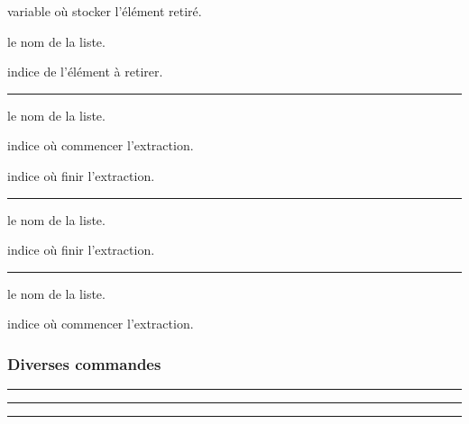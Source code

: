 \documentclass[12pt,a4paper]{article}
\theoremstyle{definition}
\newcommand\separation{
    \medskip
    \hfill\rule{0.5\textwidth}{0.75pt}\hfill
    \medskip
}
\newcommand\extraspace{
    \vspace{0.25em}
}
\begin{document}
 variable où stocker l'élément retiré.

 le nom de la liste.

 indice de l'élément à retirer.




\separation



 le nom de la liste.

 indice où commencer l'extraction.

 indice où finir l'extraction.




\separation



 le nom de la liste.

 indice où finir l'extraction.




\separation



 le nom de la liste.

 indice où commencer l'extraction.





\subsubsection{Diverses commandes}








\separation








\separation




\extraspace






\separation
\end{document}
